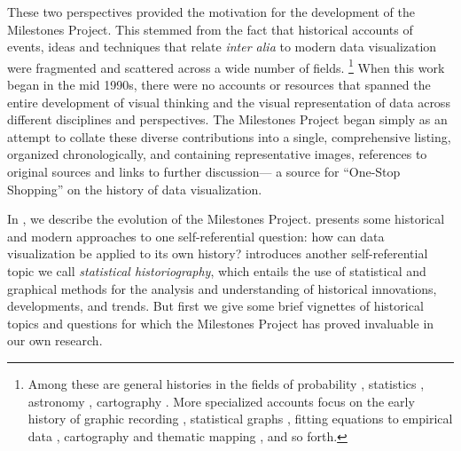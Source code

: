 These two perspectives provided the motivation for the development of the Milestones Project.
This stemmed from the fact that historical accounts of events, ideas and techniques that
relate \emph{inter alia} to modern data visualization were fragmented and
scattered across a wide number of fields.%
\footnote{
Among these are general histories
in the fields of probability \citep{Hald:1990}, statistics
\citep{Pearson:1978,Porter:1986,Stigler:1986}, astronomy \citep{Riddell:1980}, cartography \citep{WallisRobinson:87}.
More specialized accounts focus on the early history of graphic recording
\citep{HoffGeddes:1959,HoffGeddes:1962}, statistical graphs
\citep{Funkhouser:1936,Funkhouser:1937,Royston:1970,Tilling:1975}, fitting equations to empirical data
\citep{Farebrother:1999}, cartography \citep{Friis:1974,Kruskal:1977} and thematic mapping
\citep{FriendlyPalsky:2007,Palsky:1996,Robinson:1982}, and so forth.
}
When this work began in the mid 1990s, there were no accounts or resources that spanned the entire development
of visual thinking and the visual representation of data across different disciplines and perspectives.
The Milestones Project began simply as an attempt to collate these diverse contributions into a single,
comprehensive listing, organized chronologically, and containing representative images, references to
original sources and links to further discussion--- a source for ``One-Stop Shopping'' on the history of
data visualization.

In , we describe the evolution of the Milestones Project. 
presents some historical and modern approaches to one self-referential question: how can data
visualization be applied to its own history?  introduces another self-referential
topic we
call \emph{statistical historiography},
which entails the use of statistical and graphical methods for the analysis and understanding of historical innovations, developments, and trends.
But first we give some brief vignettes of historical topics and questions for which the Milestones Project has
proved invaluable in our own research.

